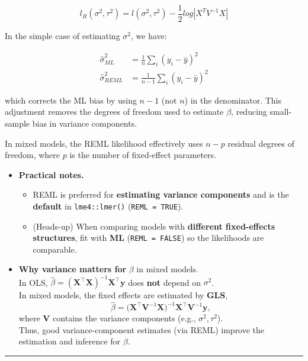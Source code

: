 \documentclass[
  letterpaper,
  DIV=11,
  numbers=noendperiod]{scrreprt}
\providecommand{\tightlist}{%
  \setlength{\itemsep}{0pt}\setlength{\parskip}{0pt}}\usepackage{longtable,booktabs,array}
\begin{document}
\[
l_R(\sigma^2, \tau^2) = l(\sigma^2, \tau^2) -\frac{1}{2} log|X^T V^{-1}X|  
\]

In the simple case of estimating \(\sigma^2\), we have:

\[
\begin{align*}
\hat{\sigma}^2_{ML}& = \frac{1}{n} \sum_i (y_i - \bar{y})^2\\
\hat{\sigma}^2_{REML}& = \frac{1}{n-1} \sum_i (y_i - \bar{y})^2
\end{align*}
\]

which corrects the ML bias by using \(n-1\) (not \(n\)) in the
denominator. This adjustment removes the degrees of freedom used to
estimate \(\beta\), reducing small-sample bias in variance components.

In mixed models, the REML likelihood effectively uses \(n-p\) residual
degrees of freedom, where \(p\) is the number of fixed-effect
parameters.

\begin{itemize}
\tightlist
\item
  \textbf{Practical notes.}

  \begin{itemize}
  \tightlist
  \item
    REML is preferred for \textbf{estimating variance components} and is
    the \textbf{default} in \texttt{lme4::lmer()}
    (\texttt{REML\ =\ TRUE}).\\
  \item
    (Heads-up) When comparing models with \textbf{different
    fixed-effects structures}, fit with \textbf{ML}
    (\texttt{REML\ =\ FALSE}) so the likelihoods are comparable.
  \end{itemize}
\item
  \textbf{Why variance matters for} \(\beta\) in mixed models.\\
  In OLS,
  \(\hat\beta=(\mathbf{X}^\top\mathbf{X})^{-1}\mathbf{X}^\top\mathbf{y}\)
  does \textbf{not} depend on \(\sigma^2\).\\
  In mixed models, the fixed effects are estimated by \textbf{GLS}, \[
  \hat\beta=\big(\mathbf{X}^\top\mathbf{V}^{-1}\mathbf{X}\big)^{-1}\mathbf{X}^\top\mathbf{V}^{-1}\mathbf{y},
  \] where \(\mathbf{V}\) contains the variance components (e.g.,
  \(\sigma^2,\tau^2\)).\\
  Thus, good variance-component estimates (via REML) improve the
  estimation and inference for \(\beta\).
\end{itemize}

\begin{center}\rule{0.5\linewidth}{0.5pt}\end{center}
\end{document}
